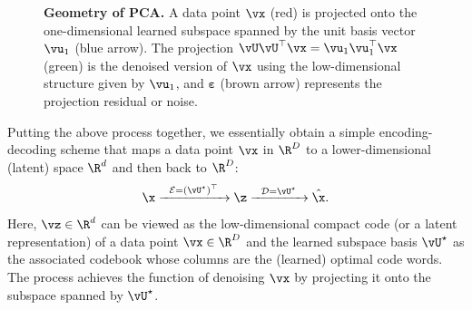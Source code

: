 \documentclass[../../book-main.tex]{subfiles}
\begin{document}
\begin{figure}
    \centering
    \caption{\small \textbf{Geometry of PCA.} A data point $\vx$
        (red) is projected onto the one-dimensional learned subspace
        spanned by the unit basis vector $\vu_1$ (blue arrow). The
        projection $\vU\vU^\top\vx = \vu_{1}\vu_{1}^{\top}\vx$ (green) is
        the denoised version of $\vx$ using the low-dimensional structure
        given by $\vu_{1}$, and $\boldsymbol{\varepsilon}$ (brown arrow)
    represents the projection residual or noise.}
    \label{fig:pca-geometry}
\end{figure}

Putting the above process together, we essentially obtain a simple
encoding-decoding scheme that maps a data point $\vx$ in $\R^D$ to a
lower-dimensional (latent) space $\R^d$ and then back to $\R^D$:
\begin{equation}
    \x \xrightarrow{\hspace{2mm} \mathcal{E} = (\vU^\star)^\top
    \hspace{2mm}}  \z
    \xrightarrow{\hspace{2mm} \mathcal{D} = \vU^\star \hspace{2mm}}   \hat{\x}.
    \label{eqn:autoencoding-PCA}
\end{equation}
Here, $\vz \in \R^d$ can be viewed as the low-dimensional compact code (or
a latent representation) of a data point  $\vx \in \R^D$ and the
learned subspace
basis $\vU^\star$ as the associated codebook whose columns are the (learned)
optimal code words. The process achieves the function of denoising $\vx$ by
projecting it onto the subspace spanned by $\vU^\star$.
\end{document}
